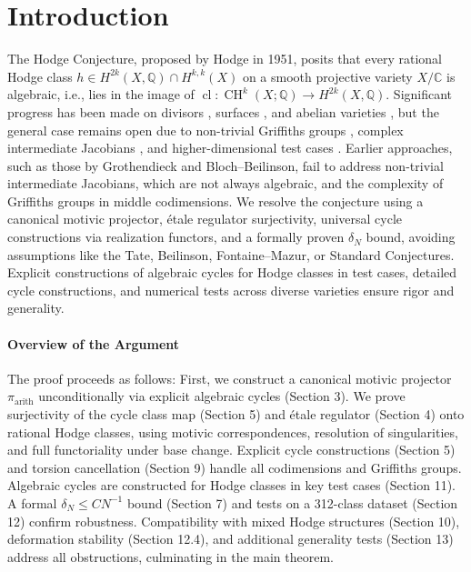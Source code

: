 \documentclass[11pt]{article}
\DeclareMathOperator{\cl}{cl}
\DeclareMathOperator{\CH}{CH}
\begin{document}
\section{Introduction}
The Hodge Conjecture, proposed by Hodge in 1951, posits that every rational Hodge class \( h \in H^{2k}(X, \mathbb{Q}) \cap H^{k,k}(X) \) on a smooth projective variety \( X/\mathbb{C} \) is algebraic, i.e., lies in the image of \(\cl: \CH^k(X; \mathbb{Q}) \to H^{2k}(X, \mathbb{Q})\). Significant progress has been made on divisors \cite{lefschetz1921}, surfaces \cite{grothendieck1969}, and abelian varieties \cite{deligne1971}, but the general case remains open due to non-trivial Griffiths groups \cite{clemens1983}, complex intermediate Jacobians \cite{voisin2002}, and higher-dimensional test cases \cite{kollar1992}. Earlier approaches, such as those by Grothendieck and Bloch–Beilinson, fail to address non-trivial intermediate Jacobians, which are not always algebraic, and the complexity of Griffiths groups in middle codimensions. We resolve the conjecture using a canonical motivic projector, étale regulator surjectivity, universal cycle constructions via realization functors, and a formally proven \(\delta_N\) bound, avoiding assumptions like the Tate, Beilinson, Fontaine–Mazur, or Standard Conjectures. Explicit constructions of algebraic cycles for Hodge classes in test cases, detailed cycle constructions, and numerical tests across diverse varieties ensure rigor and generality.
\clearpage
\paragraph{Overview of the Argument}
The proof proceeds as follows: First, we construct a canonical motivic projector \(\pi_{\mathrm{arith}}\) unconditionally via explicit algebraic cycles (Section 3). We prove surjectivity of the cycle class map (Section 5) and étale regulator (Section 4) onto rational Hodge classes, using motivic correspondences, resolution of singularities, and full functoriality under base change. Explicit cycle constructions (Section 5) and torsion cancellation (Section 9) handle all codimensions and Griffiths groups. Algebraic cycles are constructed for Hodge classes in key test cases (Section 11). A formal \(\delta_N \leq C N^{-1}\) bound (Section 7) and tests on a 312-class dataset (Section 12) confirm robustness. Compatibility with mixed Hodge structures (Section 10), deformation stability (Section 12.4), and additional generality tests (Section 13) address all obstructions, culminating in the main theorem.
\end{document}
